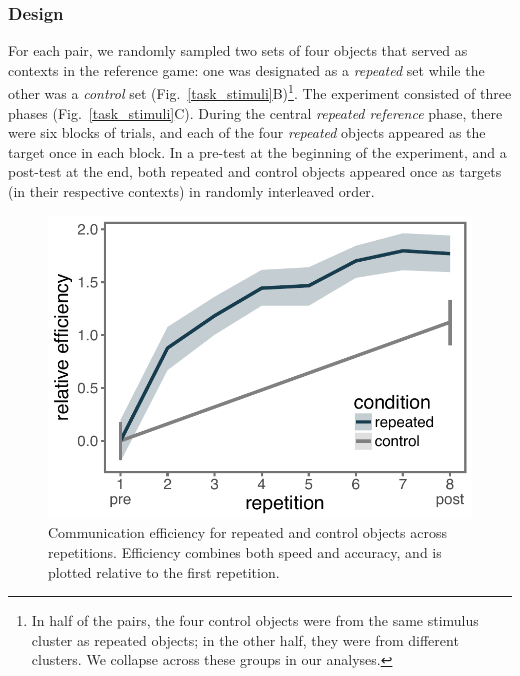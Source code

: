 \documentclass[10pt,letterpaper]{article}
\begin{document}
\subsubsection{Design}
For each pair, we randomly sampled two sets of four objects that served as contexts in the reference game: one was designated as a \emph{repeated} set while the other was a \emph{control} set (Fig.~\ref{task_stimuli}B)\footnote{In half of the pairs, the four control objects were from the same stimulus cluster as repeated objects; in the other half, they were from different clusters. We collapse across these groups in our analyses.}.%
The experiment consisted of three phases (Fig.~\ref{task_stimuli}C).
During the central \textit{repeated reference} phase, there were six blocks of trials, and each of the four \emph{repeated} objects appeared as the target once in each block.
In a pre-test at the beginning of the experiment, and a post-test at the end, both repeated and control objects appeared once as targets (in their respective contexts) in randomly interleaved order.

\begin{figure}
\begin{center}
\includegraphics[width=0.84\linewidth]{figures/refgame_BIS_timeseries.pdf}
\caption{Communication efficiency for repeated and control objects across repetitions. Efficiency combines both speed and accuracy, and is plotted relative to the first repetition.}
\label{refgame_bis}
\end{center}
\end{figure}
\end{document}
